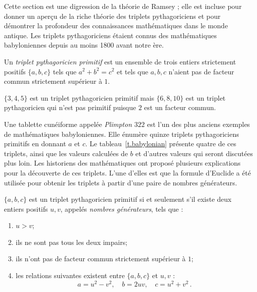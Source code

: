 Cette section est une digression de la théorie de Ramsey ; elle est incluse pour donner un aperçu de la riche théorie des triplets pythagoriciens et pour démontrer la profondeur des connaissances mathématiques dans le monde antique. Les triplets pythagoriciens étaient connus des mathématiques babyloniennes depuis au moins 1800 avant notre ère.
\begin{definition}
Un \emph{triplet pythagoricien primitif} est un ensemble de trois entiers strictement positifs $\{a,b,c\}$ tels que $a^2+b^2=c^2$ et tels que $a,b,c$ n'aient pas de facteur commun strictement supérieur à $1$.
\end{definition}
\begin{example}
$\{3,4,5\}$ est un triplet pythagoricien primitif mais $\{6,8,10\}$ est un triplet pythagoricien qui n'est pas primitif puisque $2$ est un facteur commun.
\end{example}
Une tablette cunéiforme appelée \emph{Plimpton $322$} est l'un des plus anciens exemples de mathématiques babyloniennes. Elle énumère quinze triplets pythagoriciens primitifs en donnant $a$ et $c$. Le tableau~\ref{t.babylonian} présente quatre de ces triplets, ainsi que les valeurs calculées de $b$ et d'autres valeurs qui seront discutées plus loin. Les historiens des mathématiques ont proposé plusieurs explications pour la découverte de ces triplets. L'une d'elles est que la formule d'Euclide a été utilisée pour obtenir les triplets à partir d'une paire de nombres générateurs.
\begin{theorem}[Euclide]
$\{a,b,c\}$ est un triplet pythagoricien primitif si et seulement s'il existe deux entiers positifs $u,v$, appelés \emph{nombres générateurs}, tels que :\label{thm.euclid-function}
\begin{enumerate}
\item $u>v$;
\item ils ne sont pas tous les deux impairs;
\item ils n'ont pas de facteur commun strictement supérieur à $1$;
\item les relations suivantes existent entre $\{a,b,c\}$ et $u,v$ :
\[
a=u^2-v^2,\quad b=2uv,\quad c=u^2+v^2\,.
\]
\end{enumerate}
\end{theorem}

